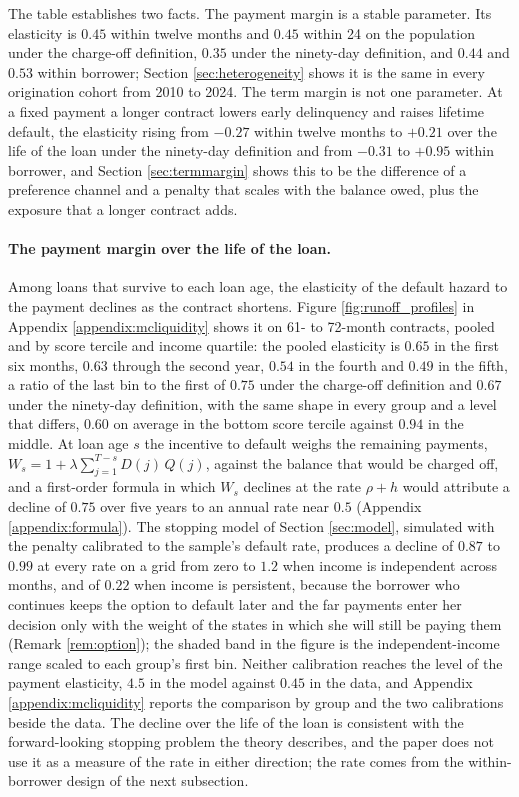 The table establishes two facts. The payment margin is a stable parameter. Its elasticity is $0.45$ within twelve months and $0.45$ within 24 on the population under the charge-off definition, $0.35$ under the ninety-day definition, and $0.44$ and $0.53$ within borrower; Section \ref{sec:heterogeneity} shows it is the same in every origination cohort from 2010 to 2024. The term margin is not one parameter. At a fixed payment a longer contract lowers early delinquency and raises lifetime default, the elasticity rising from $-0.27$ within twelve months to $+0.21$ over the life of the loan under the ninety-day definition and from $-0.31$ to $+0.95$ within borrower, and Section \ref{sec:termmargin} shows this to be the difference of a preference channel and a penalty that scales with the balance owed, plus the exposure that a longer contract adds.

\paragraph{The payment margin over the life of the loan.} Among loans that survive to each loan age, the elasticity of the default hazard to the payment declines as the contract shortens. Figure \ref{fig:runoff_profiles} in Appendix \ref{appendix:mcliquidity} shows it on 61- to 72-month contracts, pooled and by score tercile and income quartile: the pooled elasticity is $0.65$ in the first six months, $0.63$ through the second year, $0.54$ in the fourth and $0.49$ in the fifth, a ratio of the last bin to the first of $0.75$ under the charge-off definition and $0.67$ under the ninety-day definition, with the same shape in every group and a level that differs, $0.60$ on average in the bottom score tercile against $0.94$ in the middle. At loan age $s$ the incentive to default weighs the remaining payments, $W_s = 1 + \lambda \sum_{j=1}^{T-s} D(j)\,Q(j)$, against the balance that would be charged off, and a first-order formula in which $W_s$ declines at the rate $\rho + h$ would attribute a decline of $0.75$ over five years to an annual rate near $0.5$ (Appendix \ref{appendix:formula}). The stopping model of Section \ref{sec:model}, simulated with the penalty calibrated to the sample's default rate, produces a decline of $0.87$ to $0.99$ at every rate on a grid from zero to $1.2$ when income is independent across months, and of $0.22$ when income is persistent, because the borrower who continues keeps the option to default later and the far payments enter her decision only with the weight of the states in which she will still be paying them (Remark \ref{rem:option}); the shaded band in the figure is the independent-income range scaled to each group's first bin. Neither calibration reaches the level of the payment elasticity, $4.5$ in the model against $0.45$ in the data, and Appendix \ref{appendix:mcliquidity} reports the comparison by group and the two calibrations beside the data. The decline over the life of the loan is consistent with the forward-looking stopping problem the theory describes, and the paper does not use it as a measure of the rate in either direction; the rate comes from the within-borrower design of the next subsection.
